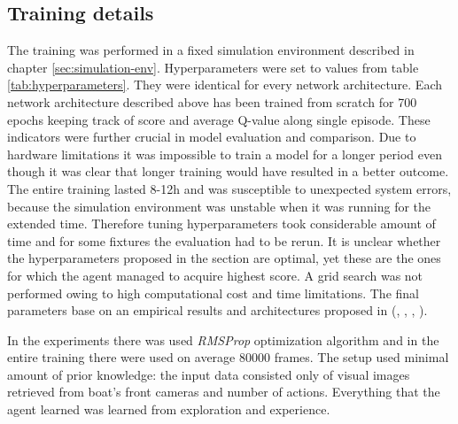 \subsection{Training details}
\label{sub:training-details}

The training was performed in a fixed simulation environment described in chapter \ref{sec:simulation-env}. Hyperparameters were set to values from
table \ref{tab:hyperparameters}. They were identical for every network architecture. Each network architecture described above has been
trained from scratch for 700 epochs keeping track of score and average Q-value along single episode. These indicators were further crucial
in model evaluation and comparison. Due to hardware limitations it was impossible to train a model for a longer period even though it was
clear that longer training would have resulted in a better outcome. The entire training lasted 8-12h and was susceptible to unexpected
system errors, because the simulation environment was unstable when it was running for the extended time. Therefore tuning hyperparameters
took considerable amount of time and for some fixtures the evaluation had to be rerun. It is unclear whether the hyperparameters proposed
in the section are optimal, yet these are the ones for which the agent managed to acquire highest score. A grid search was not performed
owing to high computational cost and time limitations. The final parameters base on an empirical results and architectures proposed in
(\cite{DQNAtari}, \cite{2020DuckieTown}, \cite{DBLP:journals/corr/HasseltGS15}, \cite{DBLP:journals/corr/WangFL15}).

In the experiments there was used \emph{RMSProp} optimization algorithm and in the entire training there were used on average 80000 frames. The setup used minimal amount of prior knowledge: the input data consisted only of visual images retrieved from boat's front cameras and number of actions. Everything that the agent learned was learned from exploration and experience.